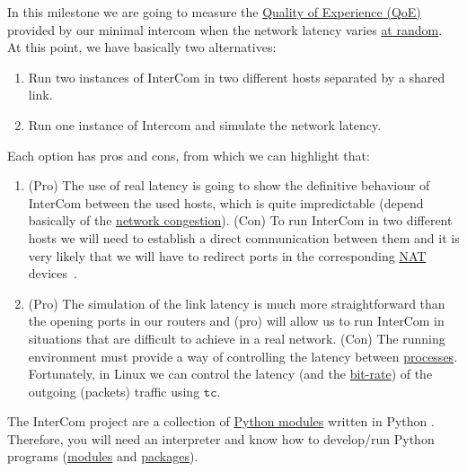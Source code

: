 In this milestone we are going to measure the
\href{https://en.wikipedia.org/wiki/Quality_of_experience}{Quality of
  Experience (QoE)} provided by our minimal intercom when the network
latency varies \href{https://en.wikipedia.org/wiki/Randomness}{at
  random}. At this point, we have basically two alternatives:
\begin{enumerate}
\item Run two instances of InterCom in two different hosts separated
  by a shared link.
\item Run one instance of Intercom and simulate the network latency.
\end{enumerate}
Each option has pros and cons, from which we can highlight that:
\begin{enumerate}
\item (Pro) The use of real latency is going to show the definitive
  behaviour of InterCom between the used hosts, which is quite
  impredictable (depend basically of the
  \href{https://en.wikipedia.org/wiki/Network_congestion}{network
    congestion}). (Con) To run InterCom in two different hosts we will
  need to establish a direct communication between them and it is very
  likely that we will have to redirect ports in the corresponding
  \href{https://en.wikipedia.org/wiki/Network_address_translation}{NAT}
  devices~\cite{}.
\item (Pro) The simulation of the link latency is much more
  straightforward than the opening ports in our routers and (pro) will
  allow us to run InterCom in situations that are difficult to achieve
  in a real network. (Con) The running environment must provide a way
  of controlling the latency between
  \href{https://en.wikipedia.org/wiki/Process_(computing)}{processes}. Fortunately,
  in Linux we can control the latency (and the
  \href{https://en.wikipedia.org/wiki/Bit_rate}{bit-rate}) of the
  outgoing (packets) traffic using
  \href{https://man7.org/linux/man-pages/man8/tc.8.html}{$\mathtt{tc}$}.
\end{enumerate}



The InterCom project \cite{intercom} are a collection of
\href{https://docs.python.org/3/tutorial/modules.html#}{Python
  modules} written in Python \cite{Python}. Therefore, you will need
an interpreter and know how to develop/run Python programs
(\href{https://docs.python.org/3/tutorial/modules.html#modules}{modules}
and
\href{https://docs.python.org/3/tutorial/modules.html#packages}{packages}).


